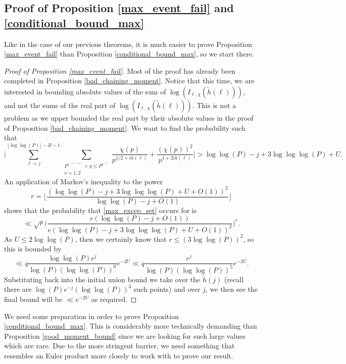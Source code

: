 \documentclass[reqno]{amsart}
\theoremstyle{definition}
\theoremstyle{remark}
\numberwithin{equation}{section}
\theoremstyle{remark}
\begin{document}
\subsection{Proof of Proposition \ref{max_event_fail} and \ref{conditional_bound_max}}
Like in the case of our previous theorems, it is much easier to prove Proposition \ref{max_event_fail} than Proposition \ref{conditional_bound_max}, so we start there.
\begin{proof}[Proof of Proposition \ref{max_event_fail}]
    Most of the proof has already been completed in Proposition \ref{bad_chaining_moment}. Notice that this time, we are interested in bounding absolute values of the sum of $\log(I_{\ell,\chi}(\tilde{h}(\ell)))$, and not the sums of the real part of $\log(I_{\ell,\chi}(\tilde{h}(\ell)))$. This is not a problem as we upper bounded the real part by their absolute values in the proof of Proposition \ref{bad_chaining_moment}.
    We want to find the probability such that
    \begin{equation}
        \big|\sum_{\ell=j}^{\lfloor\log\log(P)\rfloor - B -1}\sum_{\substack{P^{e^{-(\ell+1)}} < p \leq P^{e^{-\ell}} \\ v=1,2}}\frac{\chi(p)}{p^{1/2+ih(\ell)}}+\frac{(\chi(p))^2}{p^{1+2ih(\ell)}}\big| > \log\log(P) -j + 3\log\log\log(P)+U. \label{max_excep_set}
    \end{equation}
    An application of Markov's inequality to the power
    $$r=\big\lfloor\frac{(\log\log(P)-j+3\log\log\log(P)+U+O(1))^2}{\log\log(P)-j+O(1)}\big\rfloor$$
    shows that the probability that \ref{max_excep_set} occurs for is
    $$\ll \sqrt{r}\big(\frac{r(\log\log(P)-j+O(1))}{e(\log\log(P)-j+3\log\log\log(P)+U+O(1))^2}\big)^r.$$
    As $U \leq 2\log\log(P)$, then we certainly know that $r \leq (3\log\log(P))^2$, so this is bounded by
    $$\ll q\frac{\log\log(P)e^j}{\log(P)(\log\log(P))^6}e^{-2U} \ll q\frac{e^j}{\log(P)(\log\log(P))^{5}}e^{-2U}.$$
    Substituting back into the initial union bound we take over the $\tilde{h}(j)$ (recall there are $\log(P)e^{-j}(\log\log(P))^3$ such points) and over $j$, we then see the final bound will be $\ll e^{-2U}$ as required.
\end{proof}
We need some preparation in order to prove Proposition \ref{conditional_bound_max}. This is considerably more technically demanding than Proposition \ref{good_moment_bound} since we are looking for such large values which are rare. Due to the more stringent barrier, we need something that resembles an Euler product more closely to work with to prove our result.
\end{document}
